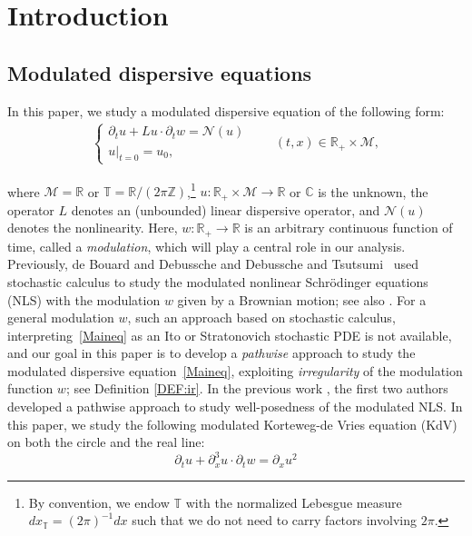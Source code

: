 \documentclass[letterpaper, 11pt,  reqno]{amsart}
\newcommand{\1}{\hspace{0.5mm}\text{I}\hspace{0.5mm}}
\newcommand{\noi}{\noindent}
\newcommand{\Z}{\mathbb{Z}}
\newcommand{\R}{\mathbb{R}}
\newcommand{\C}{\mathbb{C}}
\newcommand{\T}{\mathbb{T}}
\newcommand{\dx}{\partial_x}
\newcommand{\dt}{\partial_t}
\newcommand{\M}{\mathcal{M}}
\newcommand{\NN}{\mathcal{N}}
\numberwithin{equation}{section}
\numberwithin{theorem}{section}
\begin{document}
%
\maketitle
%


\tableofcontents









%
%
%


\newpage


\section{Introduction}\label{SEC:1}

\subsection{Modulated dispersive equations}
In this paper, we study  a modulated dispersive equation of the following form:
\begin{align}
\begin{cases}
\dt u +  L u \cdot \dt w=  \NN(u)  \\ 
u|_{t = 0} = u_0,
\end{cases}
\qquad ( t, x) \in \R_+ \times \M,
\label{Maineq}
\end{align}


\noi
where
$\M = \R$ or $  \T = \R/ (2\pi \Z)$,\footnote{By convention, we endow
$\T$ with the normalized Lebesgue measure $ dx_\T =  (2\pi)^{-1}dx$
such that we do not need to carry factors involving $2\pi$.}
 $u :\R_+\times \M \to \R$ or $\C$ is the unknown,
the operator  $L$ denotes  an (unbounded) linear dispersive operator, 
 and $\NN(u)$ denotes the nonlinearity.
Here, 
 $w:\R_+\to\R$ is an arbitrary continuous function of time, 
called a {\it modulation}, 
which will play a central role in our analysis.
Previously, 
de Bouard and Debussche \cite{DD} and Debussche and Tsutsumi~\cite{DT} 
used stochastic calculus to study 
the modulated nonlinear Schr\"odinger equations (NLS) with the modulation $w$ given by a Brownian motion;
see also \cite{DR2, Ste}.
For a general modulation $w$, 
such an approach based on stochastic calculus, 
interpreting~\eqref{Maineq}
as an Ito or Stratonovich stochastic PDE
is not available, and our goal in this paper is to develop a {\it pathwise} approach 
to study the modulated dispersive equation~\eqref{Maineq}, 
exploiting {\it irregularity} of the modulation function $w$;
see Definition \ref{DEF:ir}.
In the previous work
\cite{CG1}, the first two authors developed a pathwise
approach to study 
well-posedness of the modulated NLS. 
In this paper, we study
the following modulated 
 Korteweg-de Vries equation (KdV)
 on both the circle and the real line:
\begin{equation}
\label{kdv1}
\dt u+  \dx^3 u \cdot \dt w =\dx u^2
\end{equation}
\end{document}
